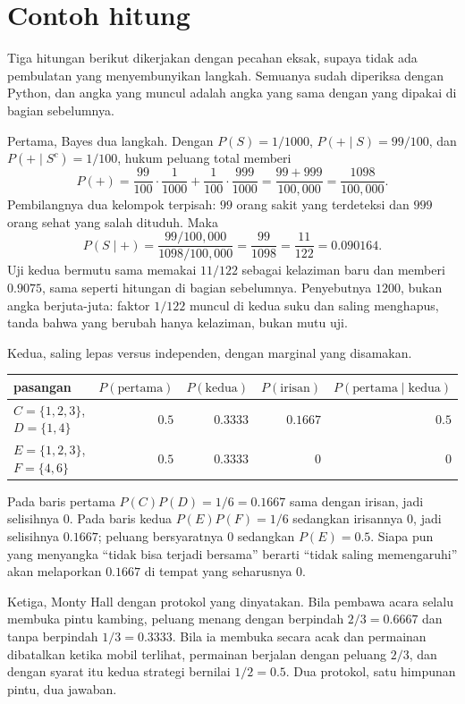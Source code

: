 \section{Contoh hitung}

Tiga hitungan berikut dikerjakan dengan pecahan eksak, supaya tidak ada pembulatan yang
menyembunyikan langkah. Semuanya sudah diperiksa dengan Python, dan angka yang muncul
adalah angka yang sama dengan yang dipakai di bagian sebelumnya.

Pertama, Bayes dua langkah. Dengan $P(S)=1/1000$, $P(+\mid S)=99/100$, dan
$P(+\mid S^{c})=1/100$, hukum peluang total memberi
\[
P(+)=\frac{99}{100}\cdot\frac{1}{1000}+\frac{1}{100}\cdot\frac{999}{1000}
=\frac{99+999}{100{,}000}=\frac{1098}{100{,}000}.
\]
Pembilangnya dua kelompok terpisah: $99$ orang sakit yang terdeteksi dan $999$ orang
sehat yang salah dituduh. Maka
\[
P(S\mid +)=\frac{99/100{,}000}{1098/100{,}000}=\frac{99}{1098}=\frac{11}{122}=0.090164 .
\]
Uji kedua bermutu sama memakai $11/122$ sebagai kelaziman baru dan memberi $0.9075$,
sama seperti hitungan di bagian sebelumnya. Penyebutnya $1200$, bukan angka berjuta-juta:
faktor $1/122$ muncul di kedua suku dan saling menghapus, tanda bahwa yang berubah hanya
kelaziman, bukan mutu uji.

Kedua, saling lepas versus independen, dengan marginal yang disamakan.

\begin{center}
\small
\begin{tabular}{lrrrr}
\hline
pasangan & $P(\text{pertama})$ & $P(\text{kedua})$ & $P(\text{irisan})$ & $P(\text{pertama}\mid\text{kedua})$ \\
\hline
$C=\{1,2,3\}$, $D=\{1,4\}$ & $0.5$ & $0.3333$ & $0.1667$ & $0.5$ \\
$E=\{1,2,3\}$, $F=\{4,6\}$ & $0.5$ & $0.3333$ & $0$ & $0$ \\
\hline
\end{tabular}
\end{center}

Pada baris pertama $P(C)P(D)=1/6=0.1667$ sama dengan irisan, jadi selisihnya $0$. Pada
baris kedua $P(E)P(F)=1/6$ sedangkan irisannya $0$, jadi selisihnya $0.1667$; peluang
bersyaratnya $0$ sedangkan $P(E)=0.5$. Siapa pun yang menyangka ``tidak bisa terjadi
bersama'' berarti ``tidak saling memengaruhi'' akan melaporkan $0.1667$ di tempat yang
seharusnya $0$.

Ketiga, Monty Hall dengan protokol yang dinyatakan. Bila pembawa acara selalu membuka
pintu kambing, peluang menang dengan berpindah $2/3=0.6667$ dan tanpa berpindah
$1/3=0.3333$. Bila ia membuka secara acak dan permainan dibatalkan ketika mobil
terlihat, permainan berjalan dengan peluang $2/3$, dan dengan syarat itu kedua strategi
bernilai $1/2=0.5$. Dua protokol, satu himpunan pintu, dua jawaban.

